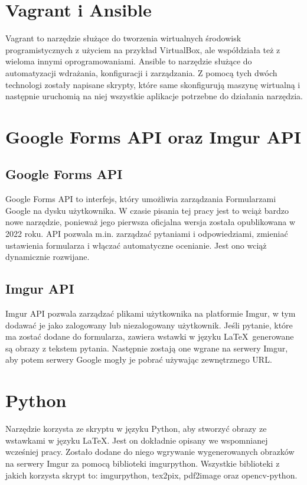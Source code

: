 \section{Vagrant i Ansible}
Vagrant\cite{vagrant} to narzędzie służące do tworzenia wirtualnych środowisk 
programistycznych z użyciem na przykład VirtualBox, ale współdziała też z wieloma
innymi oprogramowaniami.
Ansible\cite{ansible} to narzędzie służące do automatyzacji
wdrażania, konfiguracji i zarządzania. Z pomocą tych dwóch technologi zostały
napisane skrypty, które same skonfigurują maszynę wirtualną i następnie uruchomią
na niej wszystkie aplikacje potrzebne do działania narzędzia. 

\section{Google Forms API oraz Imgur API}

\subsection*{Google Forms API}
Google Forms API\cite{google-forms-api} to interfejs, który umożliwia zarządzania Formularzami Google na dysku
użytkownika. W czasie pisania tej pracy jest to wciąż bardzo nowe narzędzie, ponieważ
jego pierwsza oficjalna wersja została opublikowana w 2022 roku. API pozwala m.in. zarządzać
pytaniami i odpowiedziami, zmieniać ustawienia formularza i włączać automatyczne ocenianie.
Jest ono wciąż dynamicznie rozwijane.

\subsection*{Imgur API}
Imgur API\cite{imgur-api} pozwala zarządzać plikami użytkownika na platformie Imgur, w tym dodawać je jako
zalogowany lub niezalogowany użytkownik. Jeśli pytanie, które ma zostać dodane do formularza, 
zawiera wstawki w języku \LaTeX\, generowane są obrazy z tekstem pytania. Następnie 
zostają one wgrane na serwery Imgur, aby potem serwery Google
mogły je pobrać używając zewnętrznego URL.

\section{Python}
Narzędzie korzysta ze skryptu w języku Python\cite{python}, aby stworzyć obrazy ze wstawkami w języku \LaTeX.
Jest on dokładnie opisany we wspomnianej wcześniej pracy. Zostało dodane do niego wgrywanie 
wygenerowanych obrazków na serwery Imgur za pomocą biblioteki imgurpython.
Wszystkie biblioteki z jakich korzysta skrypt to: imgurpython\cite{imgurpython},
tex2pix\cite{tex2pix}, pdf2image\cite{pdf2image} oraz
opencv-python\cite{opencv-python}.

